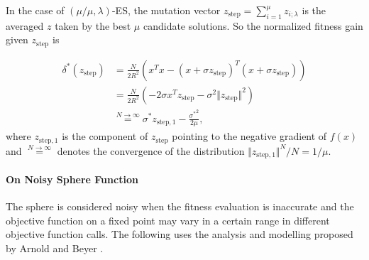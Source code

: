 In the case of $(\mu/\mu,\lambda)$-ES, the mutation vector $z_{\text{step}} = \sum_{i=1}^\mu z_{i;\lambda}$ is the averaged $z$ taken by the best $\mu$ candidate solutions. So the normalized fitness gain given $z_{\text{step}}$ is

\begin{align}{}
\delta^*(z_{\text{step}}) & = \frac{N}{2R^2} (x^Tx - (x+\sigma z_{\text{step}})^T (x+\sigma z_{\text{step}})) \nonumber\\
& = \frac{N}{2R^2} (-2 \sigma x^Tz_{\text{step}} - \sigma^2 \Vert z_{\text{step}}\Vert^2 ) \nonumber\\
& \overset{N \rightarrow \infty}{=} \sigma^* z_{\text{step},1} - \frac{{\sigma^*} ^2}{2\mu} \label{eqn:delta_z_step}{},
\end{align}
where $z_{\text{step},1} $ is the component of $z_{\text{step}}$ pointing to the negative gradient of $f(x)$ and $\overset{ N \rightarrow \infty}{=}$ denotes the convergence of the distribution $\Vert z_{\text{step},1} \Vert^N/N = 1/\mu$. 


\paragraph{On Noisy Sphere Function}
The sphere is considered noisy when the fitness evaluation is inaccurate and the objective function on a fixed point may vary in a certain range in different objective function calls. The following uses the analysis and modelling proposed by Arnold and Beyer \cite{ARNOLD2001127}. 

